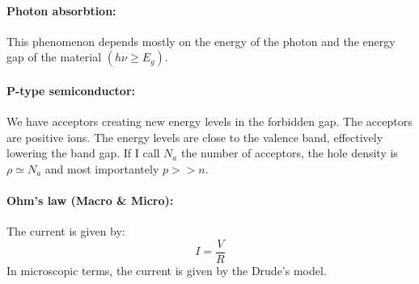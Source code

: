 \paragraph{Photon absorbtion:} This phenomenon depends mostly on the energy of the photon and the energy gap of the material $(h\nu \geq E_g)$.

\paragraph{P-type semiconductor:} We have acceptors creating new energy levels in the forbidden gap. The acceptors are positive ions. The energy levels are close to the valence band, effectively lowering the band gap. If I call $N_a$ the number of acceptors, the hole density is $\rho \simeq N_a$ and most importantely $p >> n$.

\paragraph{Ohm's law (Macro \& Micro):} The current is given by:
\begin{equation}
    I = \frac{V}{R}
\end{equation}
In microscopic terms, the current is given by the Drude's model.